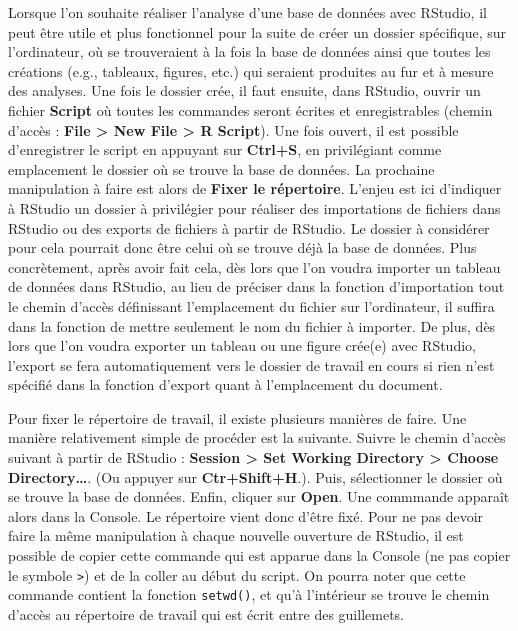 \documentclass[
  french,
]{book}
\begin{document}
Lorsque l'on souhaite réaliser l'analyse d'une base de données avec RStudio, il peut être utile et plus fonctionnel pour la suite de créer un dossier spécifique, sur l'ordinateur, où se trouveraient à la fois la base de données ainsi que toutes les créations (e.g., tableaux, figures, etc.) qui seraient produites au fur et à mesure des analyses. Une fois le dossier crée, il faut ensuite, dans RStudio, ouvrir un fichier \textbf{Script} où toutes les commandes seront écrites et enregistrables (chemin d'accès : \textbf{File \textgreater{} New File \textgreater{} R Script}). Une fois ouvert, il est possible d'enregistrer le script en appuyant sur \textbf{Ctrl+S}, en privilégiant comme emplacement le dossier où se trouve la base de données.
La prochaine manipulation à faire est alors de \textbf{Fixer le répertoire}. L'enjeu est ici d'indiquer à RStudio un dossier à privilégier pour réaliser des importations de fichiers dans RStudio ou des exports de fichiers à partir de RStudio. Le dossier à considérer pour cela pourrait donc être celui où se trouve déjà la base de données. Plus concrètement, après avoir fait cela, dès lors que l'on voudra importer un tableau de données dans RStudio, au lieu de préciser dans la fonction d'importation tout le chemin d'accès définissant l'emplacement du fichier sur l'ordinateur, il suffira dans la fonction de mettre seulement le nom du fichier à importer. De plus, dès lors que l'on voudra exporter un tableau ou une figure crée(e) avec RStudio, l'export se fera automatiquement vers le dossier de travail en cours si rien n'est spécifié dans la fonction d'export quant à l'emplacement du document.

Pour fixer le répertoire de travail, il existe plusieurs manières de faire. Une manière relativement simple de procéder est la suivante. Suivre le chemin d'accès suivant à partir de RStudio : \textbf{Session \textgreater{} Set Working Directory \textgreater{} Choose Directory\ldots{}}. (Ou appuyer sur \textbf{Ctr+Shift+H}.). Puis, sélectionner le dossier où se trouve la base de données. Enfin, cliquer sur \textbf{Open}. Une commmande apparaît alors dans la Console. Le répertoire vient donc d'être fixé. Pour ne pas devoir faire la même manipulation à chaque nouvelle ouverture de RStudio, il est possible de copier cette commande qui est apparue dans la Console (ne pas copier le symbole \texttt{\textgreater{}}) et de la coller au début du script. On pourra noter que cette commande contient la fonction \texttt{setwd()}, et qu'à l'intérieur se trouve le chemin d'accès au répertoire de travail qui est écrit entre des guillemets.
\end{document}
